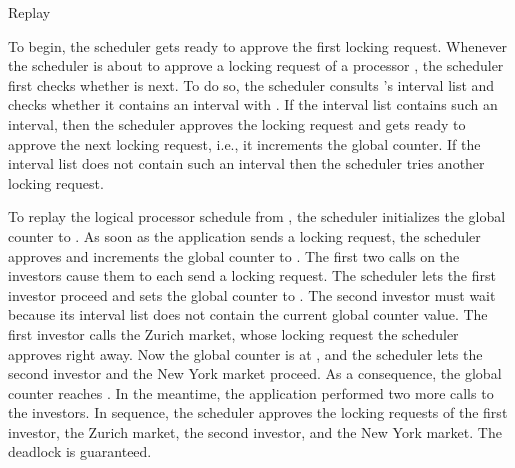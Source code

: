 \begin{algorithm}[!ht]

\caption{Replay\label{alg:replay}}
\end{algorithm}

To begin, the scheduler gets ready to approve the first locking request.
Whenever the scheduler is about to approve a locking request  of a processor , the scheduler first checks whether  is next. To do so, the scheduler consults 's interval list and checks whether it contains an interval with . If the interval list contains such an interval, then the scheduler approves the locking request and gets ready to approve the next locking request, i.e., it increments the global counter. If the interval list does not contain such an interval then the scheduler tries another locking request.

To replay the logical processor schedule from , the scheduler initializes the global counter to . As soon as the application sends a locking request, the scheduler approves and increments the global counter to . The first two calls on the investors cause them to each send a locking request. The scheduler lets the first investor proceed and sets the global counter to . The second investor must wait because its interval list does not contain the current global counter value. The first investor calls the Zurich market, whose locking request the scheduler approves right away. Now the global counter is at , and the scheduler lets the second investor and the New York market proceed. As a consequence, the global counter reaches . In the meantime, the application performed two more calls to the investors. In sequence, the scheduler approves the locking requests of the first investor, the Zurich market, the second investor, and the New York market. The deadlock is guaranteed.
